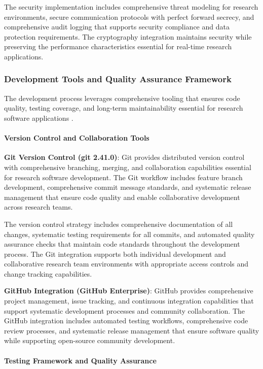 \documentclass[12pt,a4paper]{article}
\begin{document}
The security implementation includes comprehensive threat modeling for research environments, secure communication
protocols with perfect forward secrecy, and comprehensive audit logging that supports security compliance and data
protection requirements. The cryptography integration maintains security while preserving the performance
characteristics essential for real-time research applications.

\subsubsection{Development Tools and Quality Assurance Framework}

The development process leverages comprehensive tooling that ensures code quality, testing coverage, and long-term
maintainability essential for research software applications .

\paragraph{Version Control and Collaboration Tools}

\textbf{Git Version Control (git 2.41.0)}: Git provides distributed version control with comprehensive branching, merging,
and collaboration capabilities essential for research software development. The Git workflow includes feature branch
development, comprehensive commit message standards, and systematic release management that ensure code quality and
enable collaborative development across research teams.

The version control strategy includes comprehensive documentation of all changes, systematic testing requirements for
all commits, and automated quality assurance checks that maintain code standards throughout the development process. The
Git integration supports both individual development and collaborative research team environments with appropriate
access controls and change tracking capabilities.

\textbf{GitHub Integration (GitHub Enterprise)}: GitHub provides comprehensive project management, issue tracking, and
continuous integration capabilities that support systematic development processes and community collaboration. The
GitHub integration includes automated testing workflows, comprehensive code review processes, and systematic release
management that ensure software quality while supporting open-source community development.

\paragraph{Testing Framework and Quality Assurance}
\end{document}
